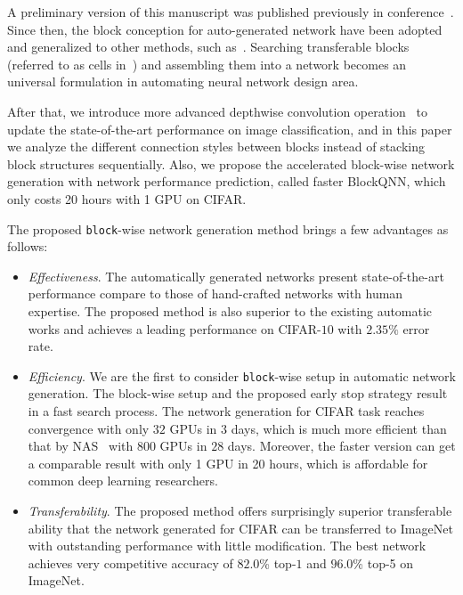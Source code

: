 \documentclass[10pt,journal,compsoc]{IEEEtran}
\begin{document}
A preliminary version of this manuscript was published previously in conference~\cite{zhong2018blockqnn}. Since then, the block conception for auto-generated network have been adopted and generalized to other methods, such as~\cite{liu2017hierarchical,real2018regularized,pham2018faster,liu2017progressive,cai2018path}. Searching transferable blocks (referred to as cells in~\cite{zoph2018learning}) and assembling them into a network becomes an universal formulation in automating neural network design area.

After that, we introduce more advanced depthwise convolution operation~\cite{chollet2016xception} to update the state-of-the-art performance on image classification, and in this paper we analyze the different connection styles between blocks instead of stacking block structures sequentially. Also, we propose the accelerated block-wise network generation with network performance prediction, called faster BlockQNN, which only costs 20 hours with 1 GPU on CIFAR.

The proposed \texttt{block}-wise network generation method brings a few advantages as follows:
\begin{itemize}
	\item \textit{Effectiveness}. The automatically generated networks present state-of-the-art performance compare to those of hand-crafted networks with human expertise.
	The proposed method is also superior to the existing automatic works and achieves a leading performance on CIFAR-$10$ with $2.35\%$ error rate.
	\item \textit{Efficiency}. We are the first to consider \texttt{block}-wise setup in automatic network generation.
	The block-wise setup and the proposed early stop strategy result in a fast search process.
	The network generation for CIFAR task reaches convergence with only $32$ GPUs in $3$ days, which is much more efficient than that by NAS~\cite{zoph2016neural} with $800$ GPUs in $28$ days.
	Moreover, the faster version can get a comparable result with only 1 GPU in 20 hours, which is affordable for common deep learning researchers.
	\item \textit{Transferability}. The proposed method offers surprisingly superior transferable ability that the network generated for CIFAR can be transferred to ImageNet with outstanding performance with little modification. The best network achieves very competitive accuracy of $82.0$\% top-$1$ and $96.0$\% top-5 on ImageNet.
\end{itemize}
\end{document}
